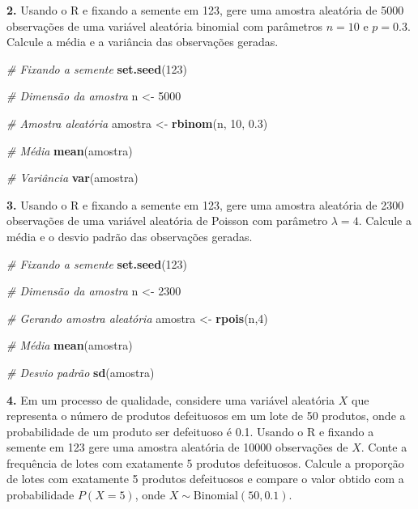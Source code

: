 \documentclass[
]{book}
\newenvironment{Shaded}{\begin{snugshade}}{\end{snugshade}}
\newcommand{\CommentTok}[1]{\textcolor[rgb]{0.56,0.35,0.01}{\textit{#1}}}
\newcommand{\DecValTok}[1]{\textcolor[rgb]{0.00,0.00,0.81}{#1}}
\newcommand{\FloatTok}[1]{\textcolor[rgb]{0.00,0.00,0.81}{#1}}
\newcommand{\FunctionTok}[1]{\textcolor[rgb]{0.13,0.29,0.53}{\textbf{#1}}}
\newcommand{\NormalTok}[1]{#1}
\newcommand{\OtherTok}[1]{\textcolor[rgb]{0.56,0.35,0.01}{#1}}
\begin{document}
\textbf{2.} Usando o R e fixando a semente em 123, gere uma amostra aleatória
de 5000 observações de uma variável aleatória binomial com parâmetros
\(n = 10\) e \(p = 0.3\). Calcule a média e a variância das observações
geradas.

\begin{Shaded}
\begin{Highlighting}[]
\CommentTok{\# Fixando a semente}
\FunctionTok{set.seed}\NormalTok{(}\DecValTok{123}\NormalTok{)}

\CommentTok{\# Dimensão da amostra}
\NormalTok{n }\OtherTok{\textless{}{-}} \DecValTok{5000}

\CommentTok{\# Amostra aleatória}
\NormalTok{amostra }\OtherTok{\textless{}{-}} \FunctionTok{rbinom}\NormalTok{(n, }\DecValTok{10}\NormalTok{, }\FloatTok{0.3}\NormalTok{)}

\CommentTok{\# Média}
\FunctionTok{mean}\NormalTok{(amostra)}

\CommentTok{\# Variância}
\FunctionTok{var}\NormalTok{(amostra)}
\end{Highlighting}
\end{Shaded}

\textbf{3.} Usando o R e fixando a semente em 123, gere uma amostra aleatória
de 2300 observações de uma variável aleatória de Poisson com parâmetro
\(\lambda = 4\). Calcule a média e o desvio padrão das observações
geradas.

\begin{Shaded}
\begin{Highlighting}[]
\CommentTok{\# Fixando a semente}
\FunctionTok{set.seed}\NormalTok{(}\DecValTok{123}\NormalTok{)}

\CommentTok{\# Dimensão da amostra}
\NormalTok{n }\OtherTok{\textless{}{-}} \DecValTok{2300}

\CommentTok{\# Gerando amostra aleatória}
\NormalTok{amostra }\OtherTok{\textless{}{-}} \FunctionTok{rpois}\NormalTok{(n,}\DecValTok{4}\NormalTok{)}

\CommentTok{\# Média}
\FunctionTok{mean}\NormalTok{(amostra)}

\CommentTok{\# Desvio padrão}
\FunctionTok{sd}\NormalTok{(amostra)}
\end{Highlighting}
\end{Shaded}

\textbf{4.} Em um processo de qualidade, considere uma variável aleatória \(X\)
que representa o número de produtos defeituosos em um lote de 50
produtos, onde a probabilidade de um produto ser defeituoso é 0.1.
Usando o R e fixando a semente em 123 gere uma amostra aleatória de
10000 observações de \(X\). Conte a frequência de lotes com exatamente 5
produtos defeituosos. Calcule a proporção de lotes com exatamente 5
produtos defeituosos e compare o valor obtido com a probabilidade
\(P(X=5)\), onde \(X \sim \text{Binomial}(50, 0.1)\).
\end{document}
